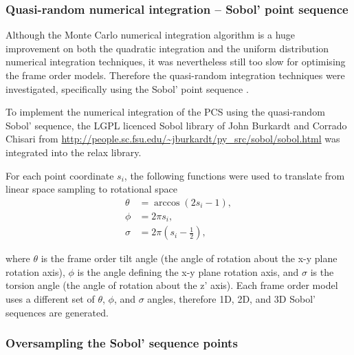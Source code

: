 
\subsubsection{Quasi-random numerical integration -- Sobol' point sequence}

Although the Monte Carlo numerical integration algorithm is a huge improvement on both the quadratic integration and the uniform distribution numerical integration techniques, it was nevertheless still too slow for optimising the frame order models.
Therefore the quasi-random integration techniques were investigated, specifically using the Sobol' point sequence \citep{Sobol67}.

To implement the numerical integration of the PCS using the quasi-random Sobol' sequence, the LGPL licenced Sobol library of John Burkardt and Corrado Chisari from \url{http://people.sc.fsu.edu/~jburkardt/py_src/sobol/sobol.html} was integrated into the relax library.

For each point coordinate $s_i$, the following functions were used to translate from linear space sampling to rotational space
\begin{subequations}
\begin{align}
    \theta &= \arccos(2s_i - 1), \\
    \phi   &= 2 \pi s_i, \\
    \sigma &= 2 \pi (s_i - \tfrac{1}{2}),
\end{align}
\end{subequations}

where $\theta$ is the frame order tilt angle (the angle of rotation about the x-y plane rotation axis), $\phi$ is the angle defining the x-y plane rotation axis, and $\sigma$ is the torsion angle (the angle of rotation about the z' axis).
Each frame order model uses a different set of $\theta$, $\phi$, and $\sigma$ angles, therefore 1D, 2D, and 3D Sobol' sequences are generated.





\subsubsection{Oversampling the Sobol' sequence points}

